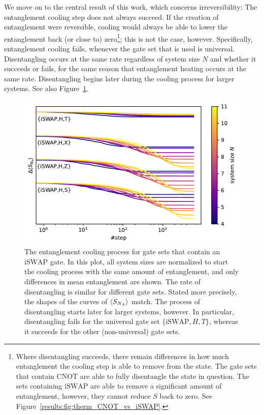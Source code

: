 \documentclass[reprint,amsmath,amssymb,aps,prb,nofootinbib]{revtex4-2}
\begin{document}
    We move on to the central result of this work, which concerns irreversibility: The entanglement cooling step
    does not always succeed. If the creation of entanglement were reversible, cooling would always be able to lower
    the entanglement back (or close to) zero\footnote{Where disentangling succeeds, there remain differences in how
    much entanglement the cooling step is able to remove from the state. The gate sets that contain $\text{CNOT}$ are
    able to fully disentangle the state in question. The sets containing $\text{iSWAP}$ are able to remove a
    significant amount of entanglement, however, they cannot reduce $S$ back to zero. See
    Figure~\ref{results:fig:therm_CNOT_vs_iSWAP}.}; this is not the case, however. Specifically, entanglement cooling fails,
    whenever the gate set that is used is universal. Disentangling occurs at the same rate regardless of system
    size $N$ and whether it succeeds or fails, for the same reason that entanglement heating occurs at the same rate.
    Disentangling begins later during the cooling process for larger systems. See also Figure~\ref{results:fig:therm_spped_iSWAP}.

    \begin{figure}[htb]
        \includegraphics[width=\columnwidth]{plots/therm_speed_iSWAP.pdf}
        \caption{The entanglement cooling process for gate sets that contain an $\text{iSWAP}$ gate. In this plot, all system sizes
        are normalized to start the cooling process with the same amount of entanglement, and only differences in mean
        entanglement are shown. The rate of disentangling
        is similar for different gate sets. Stated more precisely, the shapes of the curves of $\braket{S_{N_A}}$ match. The
        process of disentangling starts later for larger systems, however. In particular, disentangling fails for the
        universal gate set $\{\text{iSWAP},H,T\}$, whereas it succeeds for the other (non-universal) gate sets.}
        \label{results:fig:therm_spped_iSWAP}
    \end{figure}
\end{document}
